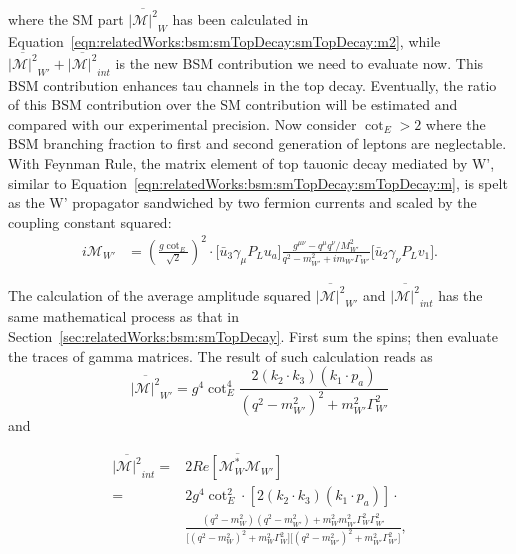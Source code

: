 \noindent where the SM part $\overline{ |\mathcal{M}|^2 } _{W} $  has been calculated in Equation~\ref{eqn:relatedWorks:bsm:smTopDecay:smTopDecay:m2}, while $\overline{ |\mathcal{M}|^2 } _{W'} +  \overline{ |\mathcal{M}|^2 } _{int}$ is the new BSM contribution we need to evaluate now. This BSM contribution enhances tau channels in the top decay. Eventually, the ratio of this BSM contribution over the SM contribution will be estimated and compared with our experimental precision. Now consider $\cot_E > 2$ where the BSM branching fraction to first and second generation of leptons are neglectable. With Feynman Rule, the matrix element of top tauonic decay mediated by W', similar to Equation~\ref{eqn:relatedWorks:bsm:smTopDecay:smTopDecay:m}, is spelt as the W' propagator sandwiched by two fermion currents and scaled by the coupling constant squared:
\begin{equation}
\begin{split}
	i \mathcal{M}_{W'}  & =  (\frac{g \cot_E}{\sqrt{2}})^2 \cdot 
	\big[ \bar{u}_3 \gamma_\mu P_L u_a \big] 
	\frac{g^{\mu \nu} - q^\mu q^\nu/M^2_{W'}}{q^2-m^2_{W'} + i m_{W'} \Gamma_{W'}} 
	\big[ \bar{u}_2 \gamma_\nu P_L v_1 \big] .
\end{split}
\end{equation}

\noindent The calculation of the average amplitude squared  $\overline{ |\mathcal{M}|^2 } _{W'} $ and $\overline{ |\mathcal{M}|^2 } _{int}$ has the same mathematical process as that in Section~\ref{sec:relatedWorks:bsm:smTopDecay}. First sum the spins; then evaluate the traces of gamma matrices. The result of such calculation reads as
\begin{equation}
	\overline{ |\mathcal{M}|^2 }_{W'} =  g^4 \cot_E^4 \frac{2  (  k_2 \cdot k_3) (  k_1 \cdot p_a) }{ (  q^2-m^2_{W'})^2 +  m^2_{W'} \Gamma^2_{W'} }  
\end{equation}
\noindent and

\begin{equation}
\begin{split}
    \overline{ |\mathcal{M}|^2 } _{int} = &   2 \overline{ Re[\mathcal{M}^*_W \mathcal{M}_{W'}] }  \\
    =& 2 g ^4\cot^2_E  \cdot  [2  (  k_2 \cdot k_3) (  k_1 \cdot p_a) ] \cdot \\
    &\frac 
    {( q^2-m^2_{W}) ( q^2-m^2_{W'}) + m^2_{W}  m^2_{W'}  \Gamma^2_{W} \Gamma^2_{W'} }
    { \big[ ( q^2-m^2_{W})^2 +  m^2_{W} \Gamma^2_{W} \big] \big[ (  q^2-m^2_{W'})^2 +  m^2_{W'} \Gamma^2_{W'} \big] }   
    ,
\end{split}
\end{equation}

